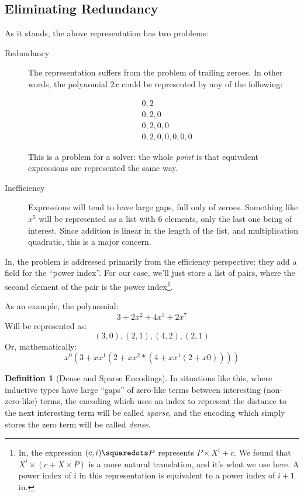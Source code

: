 \documentclass[draft, twocolumn]{article}
\theoremstyle{definition}
\newtheorem{definition}{Definition}[section]
\theoremstyle{definition}
\begin{document}
\subsection{Eliminating Redundancy}
As it stands, the above representation has two problems:

\begin{description}
  \item[Redundancy] The representation suffers from the problem of trailing
    zeroes. In other words, the polynomial $2x$ could be represented by any of
    the following:
  
    \begin{align*}
      & 0, 2 \\
      & 0, 2, 0 \\
      & 0, 2, 0, 0 \\
      & 0, 2, 0, 0, 0, 0, 0
    \end{align*}
    
    This is a problem for a solver: the whole \emph{point} is that equivalent
    expressions are represented the same way.

  \item[Inefficiency] Expressions will tend to have large gaps, full only of
    zeroes. Something like $x^5$ will be represented as a list with 6 elements,
    only the last one being of interest. Since addition is linear in the length
    of the list, and multiplication quadratic, this is a major concern.
\end{description}

In\cite{gregoire_proving_2005}, the problem is addressed primarily from the
efficiency perspective: they add a field for the ``power index''. For our case,
we'll just store a list of pairs, where the second element of the pair is the
power index\footnote{
  In\cite{gregoire_proving_2005}, the expression \((c , i) \squaredots P\)
  represents \(P \times X^i + c\). We found that \(X^i \times (c + X \times P)\)
  is a more natural translation, and it's what we use here. A power index of
  \(i\) in this representation is equivalent to a power index of \(i+1\)
  in\cite{gregoire_proving_2005}.
}.

As an example, the polynomial:
\[ 3 + 2x^2 + 4x^5 + 2x^7 \]
Will be represented as:
\[ (3,0),(2,1),(4,2),(2,1) \]
Or, mathematically:
\[ x^0 (3 + x x^1 (2 + x x^2 * (4 + x x^1 (2 + x 0)))) \]

\begin{definition}[Dense and Sparse Encodings]
  In situations like this, where inductive types have large ``gaps'' of
  zero-like terms between interesting (non-zero-like) terms, the encoding which
  uses an index to represent the distance to the next interesting term will be
  called \emph{sparse}, and the encoding which simply stores the zero term will
  be called \emph{dense}.
\end{definition}
\end{document}
